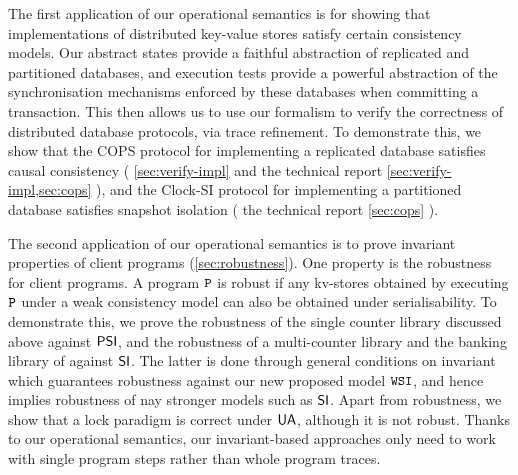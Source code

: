 

The first application of our operational
semantics is for showing that implementations of distributed
key-value stores satisfy certain consistency models. 
Our abstract states provide a 
faithful abstraction of replicated and partitioned
databases, and execution tests provide a powerful abstraction of the synchronisation mechanisms 
enforced by these databases when committing a transaction. 
This then allows us to use our 
formalism to verify the correctness of distributed database protocols,
via trace refinement.
To demonstrate this, we show that the
COPS protocol \citep{cops} for implementing a replicated database 
satisfies causal consistency  
(%
\ifTechRepEdits%
\cref{sec:verify-impl} and the technical report%
\else%
\cref{sec:verify-impl,sec:cops}%
\fi%
), 
and the Clock-SI protocol \citep{clocksi} for implementing a
partitioned database satisfies snapshot isolation
(%
\ifTechRepEdits%
the technical report%
\else%
\cref{sec:cops}%
\fi%
). 

The second application of our operational semantics is to prove
invariant properties of client programs (\cref{sec:robustness}).
One property is the robustness for client programs.
A program \(\mathtt{P}\) is robust if any kv-stores obtained 
by executing \(\mathtt{P}\) under a weak consistency model can also be obtained under serialisability.
To demonstrate this, we prove the robustness of the single
counter library discussed above against \(\mathsf{PSI}\), 
and the robustness of a multi-counter library and the banking library of \citet{bank-example-wsi}
against \(\mathsf{SI}\).
The latter is done through general conditions on invariant
which guarantees robustness against our new proposed model \( \mathtt{WSI} \),
and hence implies robustness of nay stronger models such as  \( \mathsf{SI} \).
Apart from robustness,
we show that a lock paradigm is correct under \( \mathsf{UA} \), 
although it is not robust.
Thanks to our operational semantics, 
our invariant-based approaches only need to work with single program steps 
rather than whole program traces.
